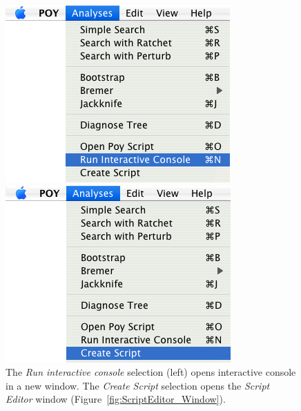 \begin{figure}
\centering
\begin{minipage}[c]{0.48\textwidth}
   		\includegraphics[width=\textwidth]{figures/RunInteractive_Menu.jpg}
\end{minipage}
\quad
\begin{minipage}[c]{0.48\textwidth}
	   	\includegraphics[width=\textwidth]{figures/create_script_window.jpg}
   	\end{minipage}
\caption{The \emph{Run interactive console} selection (left) opens \poy interactive console in a new window. The \emph{Create Script} selection opens the \emph{Script Editor} window (Figure~\ref{fig:ScriptEditor_Window}).}
\label{fig:runinteractive}
\end{figure}

